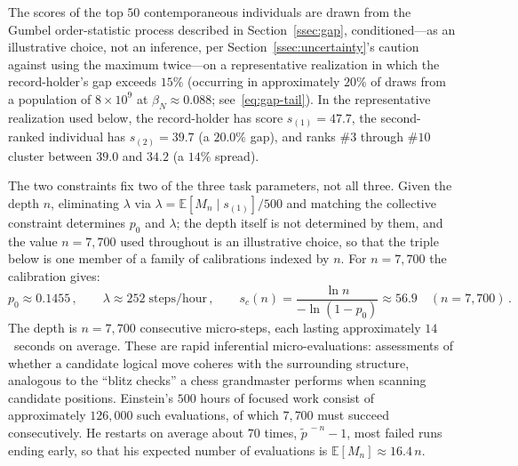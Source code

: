 \documentclass{article}
\begin{document}
\noindent
The scores of the top $50$ contemporaneous individuals are drawn from
the Gumbel order-statistic process described in Section~\ref{ssec:gap},
conditioned---as an illustrative choice, not an inference, per Section~\ref{ssec:uncertainty}'s caution against using the maximum twice---on a representative realization in which the record-holder's
gap exceeds $15\%$ (occurring in approximately $20\%$ of draws from a population of $8 \times 10^9$ at $\beta_N \approx 0.088$; see~\eqref{eq:gap-tail}). In the
representative realization used below, the record-holder has score
$s_{(1)} = 47.7$, the second-ranked individual has $s_{(2)} = 39.7$
(a $20.0\%$ gap), and ranks $\#3$ through $\#10$ cluster between $39.0$
and $34.2$ (a $14\%$ spread).

The two constraints fix two of the three task parameters, not all three. Given the depth $n$, eliminating $\lambda$ via $\lambda = \mathbb{E}[M_n \mid s_{(1)}] / 500$ and matching the collective constraint determines $p_0$ and $\lambda$; the depth itself is not determined by them, and the value $n = 7{,}700$ used throughout is an illustrative choice, so that the triple below is one member of a family of calibrations indexed by $n$. For $n = 7{,}700$ the calibration gives:
\begin{equation}\label{eq:calibrated}
  p_0 \approx 0.1455\,,
  \qquad
  \lambda \approx 252\;\text{steps/hour}\,,
  \qquad
  s_c(n) = \frac{\ln n}{-\ln(1-p_0)} \approx 56.9 \quad (n = 7{,}700)\,.
\end{equation}
The depth is $n = 7{,}700$ consecutive micro-steps, each lasting
approximately $14$~seconds on average. These are rapid inferential
micro-evaluations: assessments of whether a candidate logical move
coheres with the surrounding structure, analogous to the ``blitz checks''
a chess grandmaster performs when scanning candidate positions.
Einstein's $500$ hours of focused work consist of approximately
$126{,}000$ such evaluations, of which $7{,}700$ must succeed
consecutively. He restarts on average about $70$ times, $\widetilde{p}^{\,-n} - 1$, most failed runs ending early, so that his expected number of evaluations is $\mathbb{E}[M_n] \approx 16.4\,n$.
\end{document}
